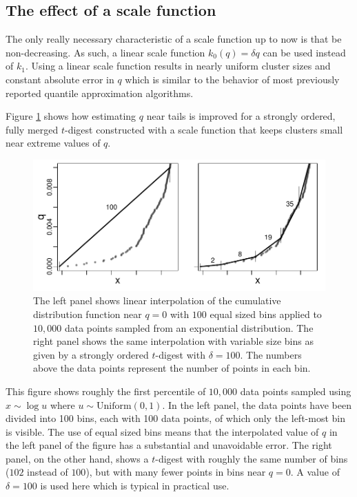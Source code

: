 \documentclass[11pt]{amsart}
\begin{document}
\subsection{The effect of a scale function}

The only really necessary characteristic of a scale function up to now is that be non-decreasing. As such,  a linear scale function $k_0(q) = \delta q$ can be used instead of  $k_1$. Using a linear scale function results in nearly uniform cluster sizes and constant absolute error in $q$  which is similar to the behavior of most previously reported quantile approximation algorithms. 

Figure \ref{fig:linear-interpolation} shows how  estimating $q$ near tails is improved for a strongly ordered, fully merged $t$-digest constructed with a scale function that keeps clusters small near extreme values of $q$. 
\begin{figure}[h] %
   \centering
   \includegraphics[height=2.in, clip]{linear-interpolation.pdf} 
   \caption{The left panel shows linear interpolation of the cumulative distribution function near $q=0$ with $100$ equal sized bins applied to $10,000$ data points sampled from an exponential distribution. The right panel shows the same interpolation with variable size bins as given by a strongly ordered $t$-digest with $\delta=100$. The numbers above the data points represent the number of points in each bin. }
   \label{fig:linear-interpolation}
\end{figure}
This figure shows roughly the first percentile of $10,000$ data points sampled using $x \sim \log u$ where $u \sim \mathrm{Uniform}(0,1)$. In the left panel, the data points have been divided into 100 bins, each with 100 data points, of which only the left-most bin is visible. The use of equal sized bins means that the interpolated value of $q$ in the left panel of the figure has a substantial and unavoidable error. The right panel, on the other hand, shows a $t$-digest with roughly the same number of bins ($102$ instead of $100$), but with many fewer points in bins near  $q=0$. A value of $\delta= 100$ is used here which is  typical in practical use. 
\end{document}

